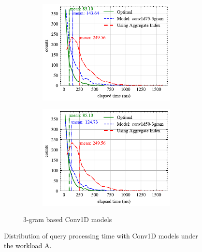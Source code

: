 \documentclass[conference]{IEEEtran}
\begin{document}
\begin{figure}[!h]
\begin{subfigure}{0.45\textwidth}
\begin{subfigure}{\textwidth}
			\includegraphics[]{graphics/perf_dist_conv1d75_3gram_A.pdf}
		\end{subfigure}
		\vfill
		\begin{subfigure}{\textwidth}
			\centering
			\includegraphics[]{graphics/perf_dist_conv1d50_3gram_A.pdf}
		\end{subfigure}
		\caption{3-gram based Conv1D models}
	\end{subfigure}
	\caption{Distribution of query processing time with Conv1D models under the workload A.}
	\label{fig:conv1d_perf_all_A}
\end{figure}
\end{document}
